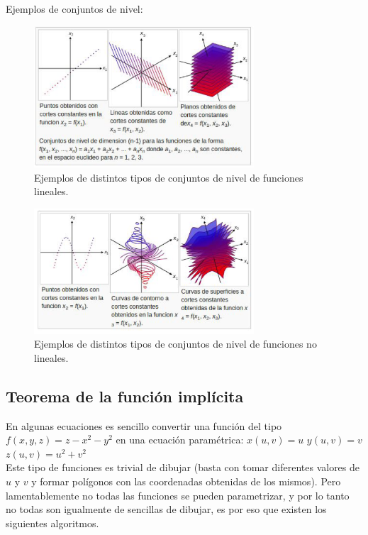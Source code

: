 \documentclass[12pt]{article}
\begin{document}
Ejemplos de conjuntos de nivel:
\begin{figure}[h!]
\includegraphics[width=0.73\textwidth,center]{meshers1.png}
\caption{Ejemplos de distintos tipos de conjuntos de nivel de funciones lineales.}
\end{figure}
\begin{figure}[h!]
\includegraphics[width=0.73\textwidth,center]{meshers2.png}
\caption{Ejemplos de distintos tipos de conjuntos de nivel de funciones no lineales.}
\end{figure}
\clearpage
\subsection{Teorema de la función implícita}
En algunas ecuaciones es sencillo convertir una función del tipo $f(x,y,z)  = z- x^2 - y^2$ en una ecuación paramétrica: 
$x(u,v) = u$
$y(u,v) = v$
$z(u,v) = u^2+v^2$
\\Este tipo de funciones es trivial de dibujar (basta con tomar diferentes valores de $u$ y $v$ y formar polígonos con las coordenadas obtenidas de los mismos).
Pero lamentablemente no todas las funciones se pueden parametrizar, y por lo tanto no todas son igualmente de sencillas de dibujar, es por eso que existen los siguientes algoritmos.
\end{document}
